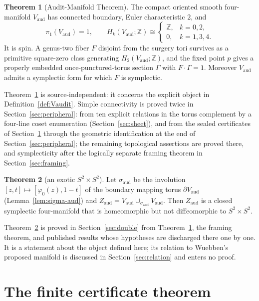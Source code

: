 \documentclass[11pt]{article}
\newcommand{\Z}{\mathbb{Z}}
\newcommand{\pione}{\pi_1}
\theoremstyle{definition}
\newtheorem{theorem}{Theorem}[section]
\begin{document}
\begin{theorem}[Audit-Manifold Theorem]\label{thm:audit-manifold}
The compact oriented smooth four-manifold $V_{\mathrm{aud}}$ has connected
boundary, Euler characteristic $2$, and
\[
 \pione(V_{\mathrm{aud}})=1,\qquad
 H_k(V_{\mathrm{aud}};\Z)\cong
 \begin{cases}
   \Z,&k=0,2,\\
   0,&k=1,3,4.
 \end{cases}
\]
It is spin.  A genus-two fiber $F$ disjoint from the surgery tori survives
as a primitive square-zero class generating $H_2(V_{\mathrm{aud}};\Z)$,
and the fixed point $p$ gives a properly embedded once-punctured-torus
section $\Gamma$ with $F\cdot\Gamma=1$.  Moreover
$V_{\mathrm{aud}}$ admits a symplectic form for which $F$ is symplectic.
\end{theorem}

Theorem~\ref{thm:audit-manifold} is source-independent: it concerns the
explicit object in Definition~\ref{def:Vaudit}.  Simple connectivity is
proved twice in Section~\ref{sec:peripheral}: from ten explicit relations
in the torus complement by a four-line coset enumeration
(Section~\ref{sec:sheet}), and from the sealed certificates of
Section~\ref{sec:certificates} through the geometric identification at the
end of Section~\ref{sec:peripheral}; the remaining topological assertions
are proved there, and symplecticity after the logically separate framing
theorem in Section~\ref{sec:framing}.

\begin{theorem}[an exotic $S^2\times S^2$]\label{thm:exotic}
Let $\sigma_{\mathrm{aud}}$ be the involution $[z,t]\mapsto[\varphi_0(z),1-t]$
of the boundary mapping torus $\partial V_{\mathrm{aud}}$
(Lemma~\ref{lem:sigma-aud}) and
$Z_{\mathrm{aud}}=V_{\mathrm{aud}}\cup_{\sigma_{\mathrm{aud}}}V_{\mathrm{aud}}$.
Then $Z_{\mathrm{aud}}$ is a closed symplectic four-manifold that is
homeomorphic but not diffeomorphic to $S^2\times S^2$.
\end{theorem}

Theorem~\ref{thm:exotic} is proved in Section~\ref{sec:double} from
Theorem~\ref{thm:audit-manifold}, the framing theorem, and published
results whose hypotheses are discharged there one by one.  It is a
statement about the object defined here; its relation to Wuebben's proposed
manifold is discussed in Section~\ref{sec:relation} and enters no proof.

\section{The finite certificate theorem}\label{sec:certificates}
\end{document}
